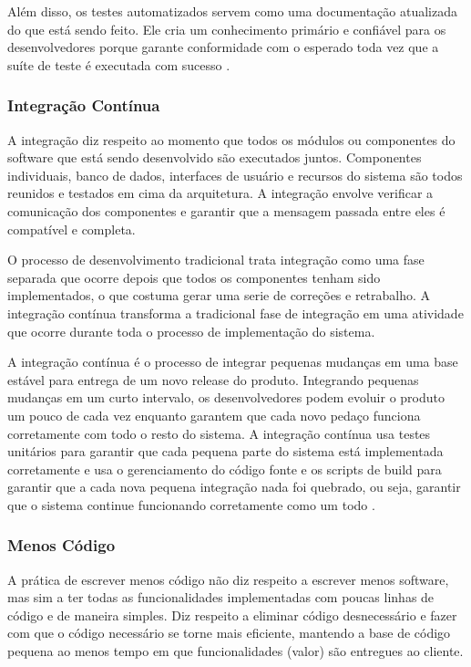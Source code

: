 Além disso, os testes automatizados servem como uma documentação atualizada do que está sendo feito. Ele cria um conhecimento primário e confiável para os desenvolvedores porque garante conformidade com o esperado toda vez que a suíte de teste é executada com sucesso \cite{hibbs2009}.

\subsubsection[Integração Contínua]{Integração Contínua}

A integração diz respeito ao momento que todos os módulos ou componentes do software que está sendo desenvolvido são executados juntos. Componentes individuais, banco de dados, interfaces de usuário e recursos do sistema são todos reunidos e testados em cima da arquitetura. A integração envolve verificar a comunicação dos componentes e garantir que a mensagem passada entre eles é compatível e completa. 

O processo de desenvolvimento tradicional trata integração como uma fase separada que ocorre depois que todos os componentes tenham sido implementados, o que costuma gerar uma serie de correções e retrabalho. A integração contínua transforma a tradicional fase de integração em uma atividade que ocorre durante toda o processo de implementação do sistema.

A integração contínua é o processo de integrar pequenas mudanças em uma base estável para entrega de um novo release do produto. Integrando pequenas mudanças em um curto intervalo, os desenvolvedores podem evoluir o produto um pouco de cada vez enquanto garantem que cada novo pedaço funciona corretamente com todo o resto do sistema. A integração contínua usa testes unitários para garantir que cada pequena parte do sistema está implementada corretamente e usa o gerenciamento do código fonte e os scripts de build para garantir que a cada nova pequena integração nada foi quebrado, ou seja, garantir que o sistema continue funcionando corretamente como um todo \cite{hibbs2009}. 

\subsubsection[Menos Código ]{Menos Código}

A prática de escrever menos código não diz respeito a escrever menos software, mas sim a ter todas as funcionalidades implementadas com poucas linhas de código e de maneira simples. Diz respeito a eliminar código desnecessário e fazer com que o código necessário se torne mais eficiente, mantendo a base de código pequena ao menos tempo em que funcionalidades (valor) são entregues ao cliente.

